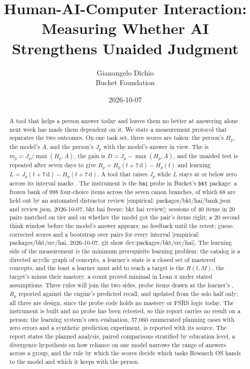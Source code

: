 \documentclass[11pt]{article}
\title{Human-AI-Computer Interaction: Measuring Whether AI Strengthens Unaided Judgment}
\author{Gianangelo Dichio\\Bucket Foundation}
\date{2026-10-07}
\newcommand{\emp}[1]{\textcolor{bucketgray}{\footnotesize [empirical: #1]}}
\newcommand{\hai}{\emp{packages/bkt/src/hai, 2026-10-07, git show dev:packages/bkt/src/hai}}
\newcommand{\bank}{\emp{packages/bkt/hai/bank.json and review.json, 2026-10-07, bkt hai freeze; bkt hai review}}
\begin{document}
\maketitle

\begin{abstract}
A tool that helps a person answer today and leaves them no better at answering alone next week has made them dependent on it. We state a measurement protocol that separates the two outcomes. On one task set, three scores are taken: the person's  $H_p$, the model's  $A$, and the person's  $J_p$ with the model's answer in view. The  is $m_p = J_p / \max(H_p, A)$, the gain is $D = J_p - \max(H_p, A)$, and the unaided test is repeated after seven days to give  $R_p = H_p(t + 7\,\mathrm{d}) - H_p(t)$ and learning $L = J_p(t + 7\,\mathrm{d}) - H_p(t + 7\,\mathrm{d})$. A tool that raises $J_p$ while $L$ stays at or below zero across its interval marks . The instrument is the \texttt{hai} probe in Bucket's \texttt{bkt} package: a frozen bank of 998 four-choice items across the seven canon branches, of which 68 are held out by an automated distractor review \bank; sessions of 40 items in 20 pairs matched on tier and on whether the model got the pair's items right; a 20 second think window before the model's answer appears; no feedback until the retest; guess-corrected scores and a bootstrap over pairs for every interval \hai. The learning side of the measurement is the minimum prerequisite learning problem: the catalog is a directed acyclic graph of concepts, a learner's state is a closed set of mastered concepts, and the least a learner must add to reach a target is the  $R(t, M)$, the target's  minus their mastery, a count proved minimal in Lean 4 under stated assumptions. Three rules will join the two sides, probe items drawn at the learner's , $R_p$ reported against the engine's predicted recall, and  updated from the solo half only; all three are design, since the probe code holds no mastery or FSRS logic today. The instrument is built and no probe has been retested, so this report carries no result on a person; the learning system's own evaluation, 57,060 enumerated planning cases with zero errors and a synthetic prediction experiment, is reported with its source. The report states the planned analysis, paired comparisons stratified by education level, a divergence hypothesis on how reliance on one model narrows the range of answers across a group, and the rule by which the scores decide which tasks Research OS hands to the model and which it keeps with the person.
\end{abstract}
\end{document}
